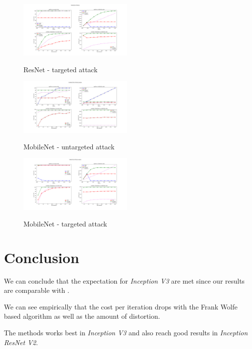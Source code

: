 \documentclass[10pt,twocolumn,letterpaper, english]{article}
\theoremstyle{definition}
\theoremstyle{plain}
\theoremstyle{plain}
\theoremstyle{plain}
\theoremstyle{plain}
\theoremstyle{remark}
\theoremstyle{remark}
\theoremstyle{definition}
\theoremstyle{definition}
\theoremstyle{definition}
\theoremstyle{definition}
\begin{document}
\begin{figure}[ht]
  \centering
  \includegraphics[width=0.5\textwidth]{report_template/Images/ResNet-targeted_grid.pdf}\\
  \caption{ResNet - targeted attack } \label{res-t}
\end{figure}

\begin{figure}[ht]
  \centering
  \includegraphics[width=0.5\textwidth]{report_template/Images/MobileNet-Untargeted.jpeg}\\
  \caption{MobileNet - untargeted attack } \label{mob-unt}
\end{figure}

\begin{figure}[ht]
  \centering
  \includegraphics[width=0.5\textwidth]{report_template/Images/Mobile_Grid_Targeted.png}\\
  \caption{MobileNet - targeted attack } \label{mob-t}
\end{figure}


\section{Conclusion}

We can conclude that the expectation for \textit{Inception V3} are met since our results are comparable with \cite{frank}.

We can see empirically that the cost per iteration drops with the Frank Wolfe based algorithm as well as the amount of distortion.

The methods works best in \textit{Inception V3} and also reach good results in \textit{Inception ResNet V2}.



{\small


}









\end{document}
